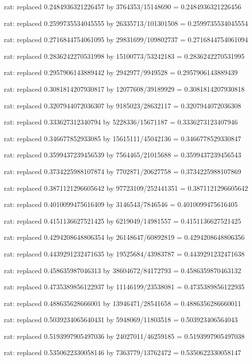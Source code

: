 \documentclass[a4paper,10pt]{article}
\begin{document}
\begin{eulernotebook}
\begin{eulercomment}
\begin{eulercomment}
\begin{eulercomment}
\begin{eulercomment}
\begin{eulercomment}
\begin{eulercomment}
\begin{eulercomment}
\begin{eulercomment}
\begin{eulercomment}
\begin{eulercomment}
\begin{eulercomment}
\begin{eulercomment}
\begin{eulercomment}
\begin{eulercomment}
\begin{eulercomment}
\begin{eulercomment}
\begin{euleroutput}
  rat: replaced 0.2484936321226457 by 3764353/15148690 = 0.2484936321226456
  
  rat: replaced 0.2599735534045555 by 26335713/101301508 = 0.2599735534045554
  
  rat: replaced 0.2716844754061095 by 29831699/109802737 = 0.2716844754061094
  
  rat: replaced 0.2836242270531998 by 15100773/53242183 = 0.2836242270531995
  
  rat: replaced 0.2957906143889442 by 2942977/9949528 = 0.2957906143889439
  
  rat: replaced 0.3081814207930817 by 12077608/39189929 = 0.3081814207930818
  
  rat: replaced 0.3207944072036307 by 9185023/28632117 = 0.3207944072036308
  
  rat: replaced 0.333627312340794 by 5228336/15671187 = 0.3336273123407946
  
  rat: replaced 0.346677852933085 by 15615111/45042136 = 0.3466778529330847
  
  rat: replaced 0.3599437239456539 by 7564465/21015688 = 0.3599437239456543
  
  rat: replaced 0.3734225988107874 by 7702871/20627758 = 0.3734225988107869
  
  rat: replaced 0.3871121296605642 by 97723109/252441351 = 0.3871121296605642
  
  rat: replaced 0.4010099475616409 by 3146543/7846546 = 0.4010099475616405
  
  rat: replaced 0.4151136627521425 by 6219049/14981557 = 0.4151136627521425
  
  rat: replaced 0.4294208648806354 by 26148647/60892819 = 0.4294208648806356
  
  rat: replaced 0.4439291232471635 by 19525684/43983787 = 0.4439291232471638
  
  rat: replaced 0.458635987046313 by 38604672/84172793 = 0.4586359870463132
  
  rat: replaced 0.4735389856122937 by 11146199/23538081 = 0.4735389856122935
  
  rat: replaced 0.488635628666001 by 13946471/28541658 = 0.4886356286660011
  
  rat: replaced 0.5039234065640431 by 5948069/11803518 = 0.503923406564043
  
  rat: replaced 0.5193997905497036 by 24027011/46259185 = 0.5193997905497038
  
  rat: replaced 0.5350622330058146 by 7363779/13762472 = 0.5350622330058147
  

\end{euleroutput}
\end{eulercomment}
\end{eulercomment}
\end{eulercomment}
\end{eulercomment}
\end{eulercomment}
\end{eulercomment}
\end{eulercomment}
\end{eulercomment}
\end{eulercomment}
\end{eulercomment}
\end{eulercomment}
\end{eulercomment}
\end{eulercomment}
\end{eulercomment}
\end{eulercomment}
\end{eulercomment}
\end{eulernotebook}
\end{document}
